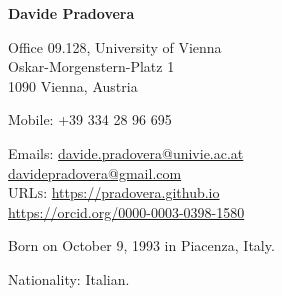 \documentclass[11pt]{article} %
\begin{document}

\begin{minipage}[c]{.75\textwidth}
{\huge\bfseries Davide Pradovera} %
\bigskip\bigskip\medskip %

Office 09.128, University of Vienna \\
Oskar-Morgenstern-Platz 1 \\
1090 Vienna, Austria
\medskip %

Mobile: +39 334 28 96 695 %
\medskip %

Emails: \href{mailto:davide.pradovera@univie.ac.at}{davide.pradovera@univie.ac.at}\\ %
\phantom{Emails: }\href{mailto:davidepradovera@gmail.com}{davidepradovera@gmail.com}\\ %
\textsc{URLs}: \href{https://pradovera.github.io}{https://pradovera.github.io}\\ %
\href{https://orcid.org/0000-0003-0398-1580}{https://orcid.org/0000-0003-0398-1580}\\ %
\end{minipage}\hfill%
\begin{minipage}[c]{.225\textwidth}
\end{minipage}\hfill%

\smallskip %


Born on October 9, 1993 in Piacenza, Italy. %

Nationality: Italian. %
\end{document}
